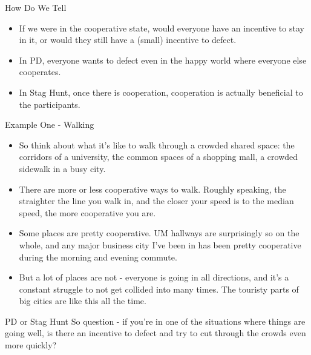 \documentclass[
  ignorenonframetext,
]{beamer}
\providecommand{\tightlist}{%
  \setlength{\itemsep}{0pt}\setlength{\parskip}{0pt}}
\begin{document}
\begin{frame}{How Do We Tell}
\protect\hypertarget{how-do-we-tell}{}
\begin{itemize}
\tightlist
\item
  If we were in the cooperative state, would everyone have an incentive
  to stay in it, or would they still have a (small) incentive to defect.
\item
  In PD, everyone wants to defect even in the happy world where everyone
  else cooperates.
\item
  In Stag Hunt, once there is cooperation, cooperation is actually
  beneficial to the participants.
\end{itemize}
\end{frame}

\begin{frame}{Example One - Walking}
\protect\hypertarget{example-one---walking}{}
\begin{itemize}
\tightlist
\item
  So think about what it's like to walk through a crowded shared space:
  the corridors of a university, the common spaces of a shopping mall, a
  crowded sidewalk in a busy city.
\item
  There are more or less cooperative ways to walk. Roughly speaking, the
  straighter the line you walk in, and the closer your speed is to the
  median speed, the more cooperative you are. \pause
\item
  Some places are pretty cooperative. UM hallways are surprisingly so on
  the whole, and any major business city I've been in has been pretty
  cooperative during the morning and evening commute. \pause
\item
  But a lot of places are not - everyone is going in all directions, and
  it's a constant struggle to not get collided into many times. The
  touristy parts of big cities are like this all the time.
\end{itemize}
\end{frame}

\begin{frame}{PD or Stag Hunt}
\protect\hypertarget{pd-or-stag-hunt-1}{}
So question - if you're in one of the situations where things are going
well, is there an incentive to defect and try to cut through the crowds
even more quickly?
\end{frame}
\end{document}

